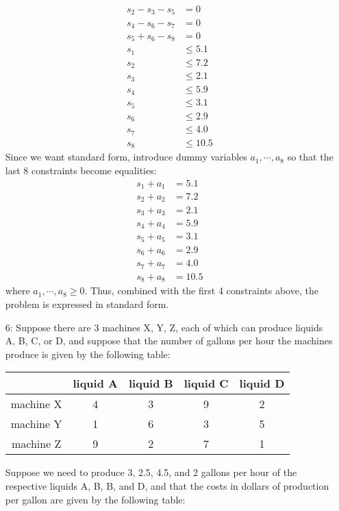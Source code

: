 \documentclass{article}
\begin{document}
\begin{itemize}
\begin{soln}
\begin{align*}
				s_2 - s_3 - s_5 &= 0 \\
				s_4 - s_6 - s_7 &= 0 \\
				s_5 + s_6 - s_8 &= 0 \\
				s_1 &\le 5.1 \\
				s_2 &\le 7.2 \\
				s_3 &\le 2.1 \\
				s_4 &\le 5.9 \\
				s_5 &\le 3.1 \\
				s_6 &\le 2.9 \\
				s_7 &\le 4.0 \\
				s_8 &\le 10.5
			\end{align*}
			Since we want standard form, introduce dummy variables $a_1, \cdots, a_8$ so that the last 8 constraints become equalities:
			\begin{align*}
				s_1+a_1 &= 5.1 \\
				s_2+a_2 &= 7.2 \\
				s_3+a_3 &= 2.1 \\
				s_4 +a_4 &= 5.9 \\
				s_5+a_5 &= 3.1 \\
				s_6+a_6 &= 2.9 \\
				s_7+a_7 &= 4.0 \\
				s_8+a_8 &= 10.5
			\end{align*}
			where $a_1, \cdots, a_8\ge 0.$ Thus, combined with the first 4 constraints above, the problem is expressed in standard form.

		\end{soln}

	\item[6:] Suppose there are 3 machines X, Y, Z, each of which can produce liquids A, B, C, or D, and suppose that the number of gallons per hour the machines produce is given by the following table:

		\begin{center}
			\begin{tabular}{c|cccc}
				& liquid A & liquid B & liquid C & liquid D \\
				\hline
				machine X & 4 & 3 & 9 & 2 \\
				machine Y & 1 & 6 & 3 & 5 \\
				machine Z & 9 & 2 & 7 & 1
			\end{tabular}
		\end{center}
		Suppose we need to produce 3, 2.5, 4.5, and 2 gallons per hour of the respective liquids A, B, B, and D, and that the costs in dollars of production per gallon are given by the following table:


\end{itemize}
\end{document}
